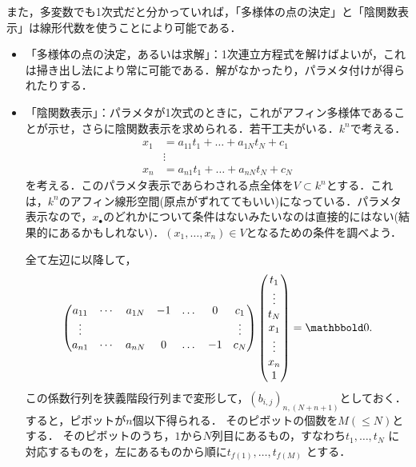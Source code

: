 また，多変数でも1次式だと分かっていれば，「多様体の点の決定」と「陰関数表示」は線形代数を使うことにより可能である．
\begin{itemize}
 \item 「多様体の点の決定，あるいは求解」：1次連立方程式を解けばよいが，これは掃き出し法により常に可能である．解がなかったり，パラメタ付けが得られたりする．
 \item 「陰関数表示」：パラメタが1次式のときに，これがアフィン多様体であることが示せ，さらに陰関数表示を求められる．若干工夫がいる．$k^n$で考える．
\begin{align}
 x_1 &=  a_{11} t_1 + \dots + a_{1N}t_N + c_1\\
 & \vdots\\
 x_n & = a_{n1} t_1 + \dots + a_{nN}t_N + c_N
\end{align}
を考える．このパラメタ表示であらわされる点全体を$V\subset k^n$とする．これは，$k^n$のアフィン線形空間(原点がずれててもいい)になっている．パラメタ表示なので，$x_\bullet$のどれかについて条件はないみたいなのは直接的にはない(結果的にあるかもしれない)．$(x_1,\dots,x_n)\in V$となるための条件を調べよう．

全て左辺に以降して，
\begin{align}
\begin{pmatrix}
 a_{11} & \cdots & a_{1N} & -1 & \dots & 0 & c_1\\
 \vdots& & & & & & \vdots\\
 a_{n1} & \cdots & a_{nN} & 0 & \dots & -1 & c_N
\end{pmatrix}
\tatev{t_1 \\ \vdots \\ t_N \\ x_1 \\ \vdots \\ x_n \\ 1}
 =
\bbold{0}.
\end{align}
この係数行列を狭義階段行列まで変形して，$(b_{i,j})_{n,(N+n+1)}$としておく．すると，ピボットが$n$個以下得られる．
そのピボットの個数を$M(\le N)$とする．
そのピボットのうち，$1$から$N$列目にあるもの，すなわち$t_1,\dots,t_N$
に対応するものを，左にあるものから順に$t_{f(1)},\dots, t_{f(M)}$       とする．


\end{itemize}

